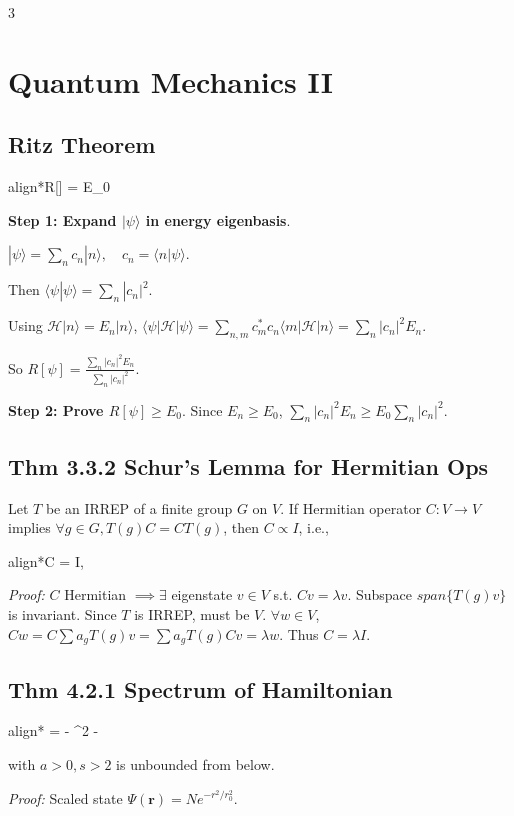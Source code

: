 \documentclass[10pt,a4paper]{article}
\newcommand{\important}[1]{\begin{empheq}[box=\fbox]{align*}#1\end{empheq}}
\begin{document}
\begin{multicols*}{3}

\section*{Quantum Mechanics II}


\subsection*{Ritz Theorem}
\important{R[\psi] = \frac{\langle \psi | \mathcal{H} | \psi \rangle}{\langle \psi | \psi \rangle} \ge E_0}
\textbf{Step 1: Expand $|\psi\rangle$ in energy eigenbasis}.

$|\psi\rangle = \sum_n c_n |n\rangle, \quad c_n = \langle n | \psi \rangle$.

Then $\langle \psi | \psi \rangle = \sum_n |c_n|^2$.

Using $\mathcal{H}|n\rangle = E_n |n\rangle$, $\langle \psi | \mathcal{H} | \psi \rangle = \sum_{n,m} c_m^* c_n \langle m | \mathcal{H} | n \rangle = \sum_n |c_n|^2 E_n$.

So $R[\psi] = \frac{\sum_n |c_n|^2 E_n}{\sum_n |c_n|^2}$.

\textbf{Step 2: Prove $R[\psi] \ge E_0$}.
Since $E_n \ge E_0$, $\sum_n |c_n|^2 E_n \ge E_0 \sum_n |c_n|^2$.

\subsection*{Thm 3.3.2 Schur's Lemma for Hermitian Ops}
Let $T$ be an IRREP of a finite group $G$ on $V$. If Hermitian operator $C: V \to V$ implies $\forall g \in G, T(g)C = C T(g)$, then $C \propto I$, i.e.,
\important{C = \lambda I, \quad \lambda \in {}}
\textit{Proof:} $C$ Hermitian $\implies \exists$ eigenstate $v \in V$ s.t. $Cv = \lambda v$.
Subspace $span\{T(g)v\}$ is invariant. Since $T$ is IRREP, must be $V$.
$\forall w \in V$, $Cw = C \sum a_g T(g)v = \sum a_g T(g) C v = \lambda w$. Thus $C = \lambda I$.

\subsection*{Thm 4.2.1 Spectrum of Hamiltonian}
\important{ = - \nabla^2 - \frac{a}{r^s}}
with $a>0, s>2$ is unbounded from below.

\textit{Proof:} Scaled state $\Psi(\mathbf{r}) = N e^{-r^2/r_0^2}$.


\end{multicols*}
\end{document}
